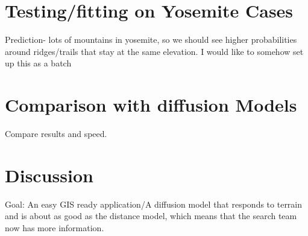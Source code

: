 \documentclass[]{article}
\begin{document}
\section{Testing/fitting on Yosemite Cases}
Prediction- lots of mountains in yosemite, so we should see higher probabilities around ridges/trails that stay at the same elevation. I would like to somehow set up this as a batch

\section{Comparison with diffusion Models}
Compare results and speed.
\section{Discussion}
Goal: An easy GIS ready application/A diffusion model that responds to terrain and is about as good as the distance model, which means that the search team now has more information.


\end{document}
